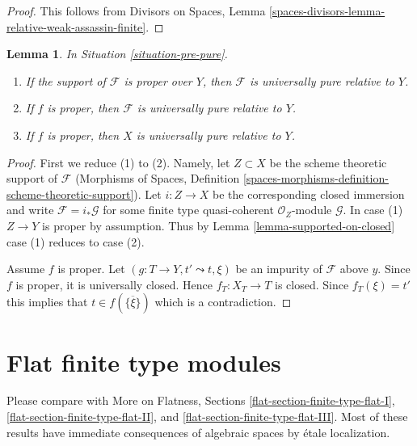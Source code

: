 \documentclass{stacks-project}
\theoremstyle{plain}
\newtheorem{lemma}[subsection]{Lemma}
\theoremstyle{definition}
\theoremstyle{remark}
\numberwithin{equation}{subsection}
\begin{document}
\begin{proof}
This follows from Divisors on Spaces, Lemma
\ref{spaces-divisors-lemma-relative-weak-assassin-finite}.
\end{proof}

\begin{lemma}
\label{lemma-proper-pure}
In Situation \ref{situation-pre-pure}.
\begin{enumerate}
\item If the support of $\mathcal{F}$ is proper over $Y$, then
$\mathcal{F}$ is universally pure relative to $Y$.
\item If $f$ is proper, then
$\mathcal{F}$ is universally pure relative to $Y$.
\item If $f$ is proper, then $X$ is universally pure relative to $Y$.
\end{enumerate}
\end{lemma}

\begin{proof}
First we reduce (1) to (2). Namely, let $Z \subset X$ be the
scheme theoretic support of $\mathcal{F}$
(Morphisms of Spaces, Definition
\ref{spaces-morphisms-definition-scheme-theoretic-support}). Let $i : Z \to X$
be the corresponding closed immersion and write
$\mathcal{F} = i_*\mathcal{G}$ for some finite type quasi-coherent
$\mathcal{O}_Z$-module $\mathcal{G}$.
In case (1) $Z \to Y$ is proper by assumption.
Thus by Lemma \ref{lemma-supported-on-closed} case (1) reduces to case (2).

\medskip\noindent
Assume $f$ is proper.
Let $(g : T \to Y, t' \leadsto t, \xi)$ be an impurity of $\mathcal{F}$
above $y$. Since $f$ is proper, it is universally closed. Hence
$f_T : X_T \to T$ is closed. Since $f_T(\xi) = t'$ this implies that
$t \in f(\overline{\{\xi\}})$ which is a contradiction.
\end{proof}







\section{Flat finite type modules}
\label{section-finite-type-flat}

\noindent
Please compare with
More on Flatness, Sections
\ref{flat-section-finite-type-flat-I},
\ref{flat-section-finite-type-flat-II}, and
\ref{flat-section-finite-type-flat-III}.
Most of these results have immediate consequences
of algebraic spaces by \'etale localization.
\end{document}
